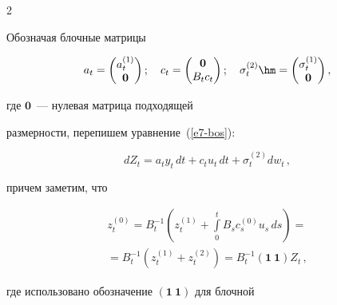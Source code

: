 \begin{multicols}{2}
\begin{equation}
     \label{e7-bos}


     \end{equation}


     


     Обозначая блочные матрицы


     $$


     a_t= \begin{pmatrix} a_t^{(1)}\\ 


\mathbf{0}\end{pmatrix};\ \ \ 


c_t= \begin{pmatrix} \mathbf{0}\\ B_t 


c_t\end{pmatrix};\ \ \ \sigma_t^{(2)}\hm= \begin{pmatrix} \sigma_t^{(1)}\\ 


\mathbf{0}\end{pmatrix},


$$


 где $\mathbf{0}$~--- нулевая матрица подходящей 


размерности, перепишем уравнение~(\ref{e7-bos}):


     \begin{equation}


     dZ_t=a_t y_t \,dt +c_t u_t \,dt +\sigma_t^{(2)} dw_t\,,


     \label{e8-bos}


\end{equation}


причем заметим, что 


\begin{multline}


z_t^{(0)} =B_t^{-1}\left( z_t^{(1)} +\int\limits_0^t B_s c_s^{(0)} u_s\, ds\right) 


={}\\


{}=B_t^{-1} \left( z_t^{(1)} +z_t^{(2)}\right) =B_t^{-1}(\mathbf{1}\ \mathbf{1}) 


Z_t\,,


\label{e9-bos}


\end{multline}


где использовано обозначение $(\mathbf{1}\ \mathbf{1})$ для блочной\linebreak 



\end{multicols}
